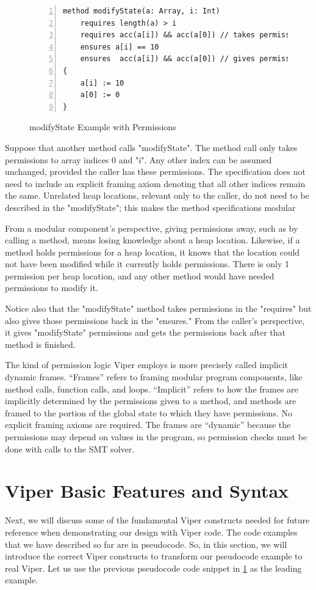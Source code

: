\documentclass[msc,oneside]{ubcthesis}
\theoremstyle{definition}
\begin{document}
\begin{figure}[h]
\begin{lstlisting}[language=silver,numbers=left, firstnumber=1, stepnumber=1]
method modifyState(a: Array, i: Int)
    requires length(a) > i
    requires acc(a[i]) && acc(a[0]) // takes permissions
    ensures a[i] == 10
    ensures  acc(a[i]) && acc(a[0]) // gives permissions
{
    a[i] := 10
    a[0] := 0
}
\end{lstlisting}
\caption{modifyState Example with Permissions}  \label{modifyState}
\end{figure}

Suppose that another method calls "modifyState".
The method call only takes permissions to array indices 0 and "i". Any other index can be assumed unchanged, provided the caller has these permissions. The specification does not need to include an explicit framing axiom denoting that all other indices remain the same. Unrelated heap locations, relevant only to the caller, do not need to be described in the "modifyState"; this makes the method specifications modular

From a modular component's perspective, giving permissions away, such as by calling a method, means losing knowledge about a heap location. Likewise, if a method holds permissions for a heap location, it knows that the location could not have been modified while it currently holds permissions. There is only 1 permission per heap location, and any other method would have needed permissions to modify it. 

Notice also that the "modifyState" method takes permissions in the "requires" but also gives those permissions back in the "ensures." From the caller's perspective, it gives "modifyState" permissions and gets the permissions back after that method is finished.

The kind of permission logic Viper employs is more precisely called implicit dynamic frames. ``Frames'' refers to framing modular program components, like method calls, function calls, and loops. ``Implicit'' refers to how the frames are implicitly determined by the permissions given to a method, and methods are framed to the portion of the global state to which they have permissions. No explicit framing axioms are required. The frames are ``dynamic'' because the permissions may depend on values in the program, so permission checks must be done with calls to the SMT solver.

\section{Viper Basic Features and Syntax}
Next, we will discuss some of the fundamental Viper constructs needed for future reference when demonstrating our design with Viper code. The code examples that we have described so far are in pseudocode. So, in this section, we will introduce the correct Viper constructs to transform our pseudocode example to real Viper. Let us use the previous pseudocode code snippet in \cref{modifyState} as the leading example.
\end{document}
